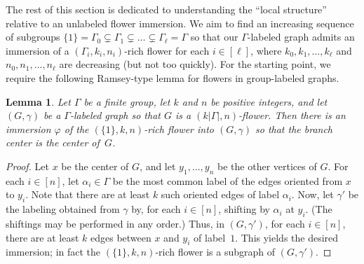 \documentclass[11pt]{article}
\newtheorem{lemma}[thm]{Lemma}
\theoremstyle{definition}
\begin{document}

The rest of this section is dedicated to understanding the ``local structure'' relative to an unlabeled flower immersion. We aim to find an increasing sequence of subgroups $\{1\}=\Gamma_0 \subsetneq \Gamma_1 \subsetneq \ldots \subsetneq \Gamma_{\ell}=\Gamma$ so that our $\Gamma$-labeled graph admits an immersion of a $(\Gamma_i, k_i, n_i)$-rich flower for each $i \in [\ell]$, where $k_0, k_1, \ldots, k_{\ell}$ and $n_0, n_1, \ldots, n_{\ell}$ are decreasing (but not too quickly). For the starting point, we require the following Ramsey-type lemma for flowers in group-labeled graphs.


\begin{lemma}
\label{lem:ZeroFlower}
    Let $\Gamma$ be a finite group, let $k$ and $n$ be positive integers, and let $(G, \gamma)$ be a $\Gamma$-labeled graph so that $G$ is a $(k|\Gamma|, n)$-flower. Then there is an immersion $\varphi$ of the $(\{1\}, k, n)$-rich flower into $(G, \gamma)$ so that the branch center is the center of~$G$.
\end{lemma}
\begin{proof}
    Let $x$ be the center of $G$, and let $y_1, \dots, y_{n}$ be the other vertices of $G$. For each $i \in [n]$, let $\alpha_i \in \Gamma$ be the most common label of the edges oriented from $x$ to $y_i$. Note that there are at least $k$ such oriented edges of label $\alpha_i$. Now, let $\gamma'$ be the labeling obtained from $\gamma$ by, for each $i \in [n]$, shifting by $\alpha_i$ at $y_i$. (The shiftings may be performed in any order.) Thus, in $(G, \gamma')$, for each $i\in [n]$, there are at least $k$ edges between $x$ and $y_i$ of label~$1$. This yields the desired immersion; in fact the $(\{1\}, k, n)$-rich flower is a subgraph of $(G, \gamma')$.
\end{proof}
\end{document}
